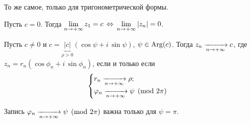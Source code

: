 \begin{Task}
	То же самое, только для тригонометрической формы.
	\begin{roItems}
	\item Пусть $c=0$. Тогда $\lim\limits_{n\rightarrow+\infty} z_1=c\,\Leftrightarrow\, \lim\limits_{n\rightarrow+\infty}|z_n|=0$.
	\item Пусть $c\ne 0$ и $c = \underbrace{|c|}_{\rho>0}(\cos\psi+i\,\sin\psi)$, $\psi\in \operatorname{Arg}(c)$. Тогда $z_n\xrightarrow[n\rightarrow+\infty]{} c$, где $z_n = r_n(\cos\phi_n+i\,\sin \phi_n)$, если и только если
		\[
			\begin{cases}
				r_n\xrightarrow[n\rightarrow+\infty]{} \rho;\\\varphi_n\xrightarrow[n\rightarrow+\infty]{} \psi\pmod{2\pi}
			\end{cases}
		\]
	\end{roItems}
	Запись $\varphi_n\xrightarrow[n\rightarrow+\infty]{} \psi\pmod{2\pi}$ важна только для $\psi = \pi$.
\end{Task}

